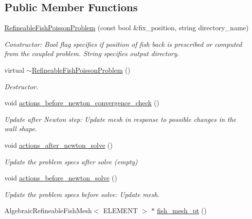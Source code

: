 \subsection*{Public Member Functions}
\begin{DoxyCompactItemize}
\item 
\hyperlink{classRefineableFishPoissonProblem_a39da6bc93041c731bb3dc96b1d74c857}{Refineable\+Fish\+Poisson\+Problem} (const bool \&fix\+\_\+position, string directory\+\_\+name)
\begin{DoxyCompactList}\small\item\em Constructor\+: Bool flag specifies if position of fish back is prescribed or computed from the coupled problem. String specifies output directory. \end{DoxyCompactList}\item 
virtual \hyperlink{classRefineableFishPoissonProblem_a7039a3409520850908940927b91af9ab}{$\sim$\+Refineable\+Fish\+Poisson\+Problem} ()
\begin{DoxyCompactList}\small\item\em Destructor. \end{DoxyCompactList}\item 
void \hyperlink{classRefineableFishPoissonProblem_a8d8fb7ef1c571c57c02073edab4a7759}{actions\+\_\+before\+\_\+newton\+\_\+convergence\+\_\+check} ()
\begin{DoxyCompactList}\small\item\em Update after Newton step\+: Update mesh in response to possible changes in the wall shape. \end{DoxyCompactList}\item 
void \hyperlink{classRefineableFishPoissonProblem_a7f6c356f7c8bd0130de957297e999f40}{actions\+\_\+after\+\_\+newton\+\_\+solve} ()
\begin{DoxyCompactList}\small\item\em Update the problem specs after solve (empty) \end{DoxyCompactList}\item 
void \hyperlink{classRefineableFishPoissonProblem_a58098181f3b88c2fc65f24fb15c1a529}{actions\+\_\+before\+\_\+newton\+\_\+solve} ()
\begin{DoxyCompactList}\small\item\em Update the problem specs before solve\+: Update mesh. \end{DoxyCompactList}\item 
Algebraic\+Refineable\+Fish\+Mesh$<$ E\+L\+E\+M\+E\+NT $>$ $\ast$ \hyperlink{classRefineableFishPoissonProblem_a6f25d5110e5262e66e2900da051567a6}{fish\+\_\+mesh\+\_\+pt} ()

\end{DoxyCompactItemize}
